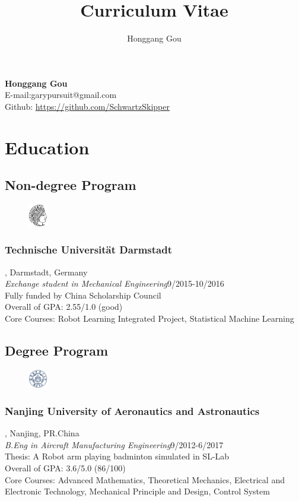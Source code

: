 \documentclass{article}
\makeatletter
\renewcommand{\maketitle}{
\begin{center}
{\Large\bfseries
Honggang Gou\\}
\vspace{0em}
E-mail:garypursuit@gmail.com\\
Github: \url{https://github.com/SchwartzSkipper}
\end{center}
}
\makeatother
\begin{document}
   
\title{Curriculum Vitae}
\author{Honggang Gou}

\maketitle

\section{Education}
\subsection{Non-degree Program}
\begin{figure}
    \begin{center}
        \includegraphics[width=0.075\textwidth]{./pic/tud.png}
    \end{center}
\end{figure}
\subsubsection{Technische Universit\"at Darmstadt}, Darmstadt, Germany\\
\emph{Exchange student in Mechanical Engineering}{\hfill9/2015-10/2016\\}
Fully funded by China Scholarship Council\\
Overall of GPA: 2.55/1.0 (good)\\
Core Courses: Robot Learning Integrated Project, Statistical Machine Learning\\
\subsection{Degree Program}
\begin{figure}
    \begin{center}
        \includegraphics[width=0.075\textwidth]{./pic/NUAA.jpg}
    \end{center}
\end{figure}
\subsubsection{Nanjing University of Aeronautics and Astronautics}
, Nanjing, PR.China\\
\emph{B.Eng in Aircraft Manufacturing Engineering}{\hfill9/2012-6/2017\\}
Thesis: A Robot arm playing badminton simulated in SL-Lab\\
Overall of GPA: 3.6/5.0 (86/100)\\
Core Courses: Advanced Mathematics, Theoretical Mechanics, Electrical and Electronic Technology, Mechanical Principle and Design, Control System
\end{document}
